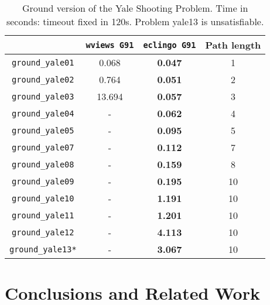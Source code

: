 \documentclass{new_tlp}
\def\eclingo{{\tt eclingo}}
\def\\wviews{{\tt \wviews}}
\def\wviews{{\tt wviews}}
\begin{document}

\begin{table}[ht]
    \begin{tabular}{c|cc|c}
        \hline
                       & \texttt{\wviews{} G91} & \texttt{\eclingo{} G91} & Path length \\ \hline
        \texttt{ground\_yale01} & 0.068      & {\bf 0.047}       & 1       \\
        \texttt{ground\_yale02} & 0.764      & {\bf 0.051}       & 2       \\
        \texttt{ground\_yale03} & 13.694     & {\bf 0.057}       & 3       \\
        \texttt{ground\_yale04} & -          & {\bf 0.062}       & 4       \\
        \texttt{ground\_yale05} & -          & {\bf 0.095}       & 5       \\
        \texttt{ground\_yale07} & -          & {\bf 0.112}       & 7       \\
        \texttt{ground\_yale08} & -          & {\bf 0.159}       & 8       \\
        \texttt{ground\_yale09} & -          & {\bf 0.195}       & 10      \\
        \texttt{ground\_yale10} & -          & {\bf 1.191}       & 10      \\
        \texttt{ground\_yale11} & -          & {\bf 1.201}       & 10      \\
        \texttt{ground\_yale12} & -          & {\bf 4.113}       & 10      \\
        \texttt{ground\_yale13*} & -         & {\bf 3.067}      & 10      \\ \hline
        \end{tabular}
\caption{Ground version of the Yale Shooting Problem. Time in seconds: timeout fixed in 120s. Problem yale13 is unsatisfiable.}
\label{tab:ground_yale}
\end{table}

\section{Conclusions and Related Work}
\label{sec:conc}
\end{document}

